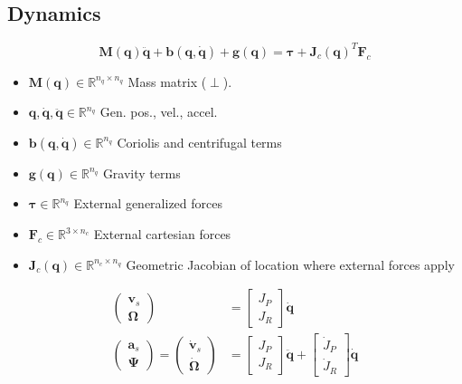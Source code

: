 \documentclass[a4paper, 8pt]{extarticle}
\begin{document}
\begin{multicols*}{3}
\section{Dynamics}
$$\boxed{\mathbf{ M(q)\ddot{q} + b(q,\dot q) + g(q)} = 
\bm\tau + \mathbf{J}_c(\mathbf q)^T \mathbf F_c}$$

\begin{itemize}
\item $\mathbf{M(q)} \in \mathbb{R}^{n_q\times n_q}$ Mass matrix ($\perp$).
\item $\mathbf{q,\dot q,\ddot q} \in \mathbb{R}^{n_q}$ Gen. pos., vel., accel.
\item $\mathbf{b(q,\dot q)} \in \mathbb{R}^{n_q}$ Coriolis and centrifugal terms
\item $\mathbf{g(q)} \in \mathbb{R}^{n_q}$ Gravity terms
\item $\bm\tau \in \mathbb{R}^{n_q}$ External generalized forces
\item $\mathbf{F}_c \in \mathbb{R}^{3\times n_c}$ External cartesian forces
\item $\mathbf J_c(\mathbf q) \in \mathbb R^{n_c\times n_q}$ Geometric Jacobian of location where external forces apply
\end{itemize}
\begin{align*}
\begin{pmatrix} \mathbf v_s \\ \bm{\Omega} \end{pmatrix} &= 
\begin{bmatrix} J_P \\ J_R \end{bmatrix} \dot{\mathbf q} \\
\begin{pmatrix} \mathbf a_s \\ \bm{\Psi} \end{pmatrix} = 
\begin{pmatrix} \dot{\mathbf v}_s \\ \dot{\bm{\Omega}} \end{pmatrix} &= 
\begin{bmatrix} J_P \\ J_R \end{bmatrix} \ddot{\mathbf q} + \begin{bmatrix} \dot J_P \\ \dot J_R \end{bmatrix} \dot{\mathbf q}
\end{align*}





\end{multicols*}
\end{document}
